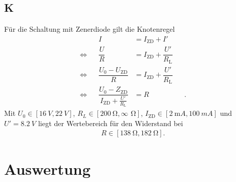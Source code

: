 \documentclass[a4paper,10pt]{article}
\numberwithin{equation}{section}
\begin{document}
\subsection{K}
Für die Schaltung mit Zenerdiode gilt die Knotenregel
\begin{align}
	                &  & I                                                            & =I_{\text{ZD}}+I'                        &  & \\
	\Leftrightarrow &  & \dfrac{U}{R}                                                 & =I_{\text{ZD}}+\dfrac{U'}{R_{\text{L}} } &  & \\
	\Leftrightarrow &  & \dfrac{U_0-U_\text{ZD}}{R}                                   & =I_\text{ZD}+\dfrac{U'}{R_\text{L}}      &  & \\
	\Leftrightarrow &  & \dfrac{U_0-Z_\text{ZD}}{I_\text{ZD}+\tfrac{U'}{R_\text{L} }} & =R                                       &  &
	.\end{align}
Mit $U_0 \in \left[\SI{16}{V},\SI{22}{V}\right]$, $R_L \in \left[\SI{200}{\ohm},\infty\,\SI{}{\ohm}\right]$, $I_\text{ZD} \in \left[\SI{2}{\milli A},\SI{100}{mA}\right]$  und $U'=\SI{8.2}{V}$ liegt der Wertebereich für den Widerstand bei
\begin{align}
	R \in \left[\SI{138}{\ohm},\SI{182}{\ohm}\right]
	.\end{align}

\clearpage
\section{Auswertung}
\end{document}
